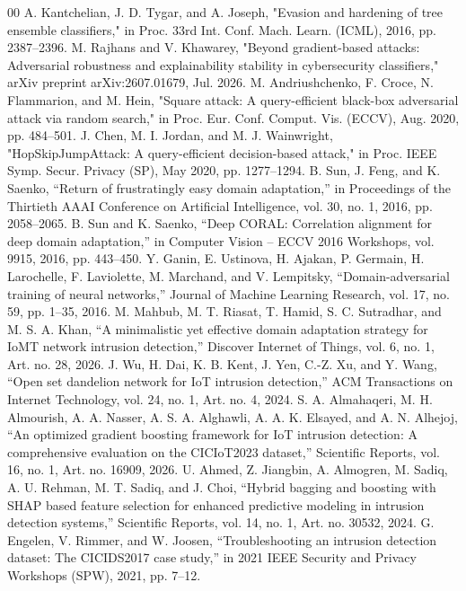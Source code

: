 \documentclass[conference]{IEEEtran}
\begin{document}
\begin{thebibliography}{00}
 A. Kantchelian, J. D. Tygar, and A. Joseph, "Evasion and hardening of tree ensemble classifiers," in Proc. 33rd Int. Conf. Mach. Learn. (ICML), 2016, pp. 2387--2396.
 M. Rajhans and V. Khawarey, "Beyond gradient-based attacks: Adversarial robustness and explainability stability in cybersecurity classifiers," arXiv preprint arXiv:2607.01679, Jul. 2026.
 M. Andriushchenko, F. Croce, N. Flammarion, and M. Hein, "Square attack: A query-efficient black-box adversarial attack via random search," in Proc. Eur. Conf. Comput. Vis. (ECCV), Aug. 2020, pp. 484--501.
 J. Chen, M. I. Jordan, and M. J. Wainwright, "HopSkipJumpAttack: A query-efficient decision-based attack," in Proc. IEEE Symp. Secur. Privacy (SP), May 2020, pp. 1277--1294.
 B. Sun, J. Feng, and K. Saenko, ``Return of frustratingly easy domain adaptation,'' in Proceedings of the Thirtieth AAAI Conference on Artificial Intelligence, vol. 30, no. 1, 2016, pp. 2058--2065.
 B. Sun and K. Saenko, ``Deep CORAL: Correlation alignment for deep domain adaptation,'' in Computer Vision -- ECCV 2016 Workshops, vol. 9915, 2016, pp. 443--450.
 Y. Ganin, E. Ustinova, H. Ajakan, P. Germain, H. Larochelle, F. Laviolette, M. Marchand, and V. Lempitsky, ``Domain-adversarial training of neural networks,'' Journal of Machine Learning Research, vol. 17, no. 59, pp. 1--35, 2016.
 M. Mahbub, M. T. Riasat, T. Hamid, S. C. Sutradhar, and M. S. A. Khan, ``A minimalistic yet effective domain adaptation strategy for IoMT network intrusion detection,'' Discover Internet of Things, vol. 6, no. 1, Art. no. 28, 2026.
 J. Wu, H. Dai, K. B. Kent, J. Yen, C.-Z. Xu, and Y. Wang, ``Open set dandelion network for IoT intrusion detection,'' ACM Transactions on Internet Technology, vol. 24, no. 1, Art. no. 4, 2024.
 S. A. Almahaqeri, M. H. Almourish, A. A. Nasser, A. S. A. Alghawli, A. A. K. Elsayed, and A. N. Alhejoj, ``An optimized gradient boosting framework for IoT intrusion detection: A comprehensive evaluation on the CICIoT2023 dataset,'' Scientific Reports, vol. 16, no. 1, Art. no. 16909, 2026.
 U. Ahmed, Z. Jiangbin, A. Almogren, M. Sadiq, A. U. Rehman, M. T. Sadiq, and J. Choi, ``Hybrid bagging and boosting with SHAP based feature selection for enhanced predictive modeling in intrusion detection systems,'' Scientific Reports, vol. 14, no. 1, Art. no. 30532, 2024.
 G. Engelen, V. Rimmer, and W. Joosen, ``Troubleshooting an intrusion detection dataset: The CICIDS2017 case study,'' in 2021 IEEE Security and Privacy Workshops (SPW), 2021, pp. 7--12.

\end{thebibliography}
\end{document}
